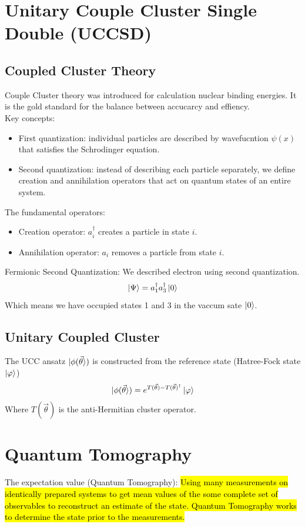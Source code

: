 \documentclass{article}
\begin{document}
\section{Unitary Couple Cluster Single Double (UCCSD)}
\subsection{Coupled Cluster Theory}
Couple Cluster theory was introduced for calculation nuclear binding energies. It is the gold standard for the balance between accucarcy and effiency. \\
Key concepts:
\begin{itemize}
	\item First quantization: individual particles are described by wavefucntion \(\psi(x)\) that satisfies the Schrodinger equation.
	\item Second quantization: instead of describing each particle separately, we define creation and annihilation operators that act on quantum states of an entire system.
\end{itemize}
The fundamental operators:
\begin{itemize}
	\item Creation operator: \(a^\dagger_i\) creates a particle in state \(i\).
	\item Annihilation operator: \(a_i\) removes a particle from state \(i\).
\end{itemize}
Fermionic Second Quantization: We described electron using second quantization.
\[\ket{\Psi} = a^\dagger_1 a^\dagger_3 \ket{0}\]
Which means we have occupied states 1 and 3 in the vaccum sate \(\ket{0}\).\\

\subsection{Unitary Coupled Cluster}
The UCC ansatz \(\ket{\phi(\vec{\theta}})\) is constructed from the reference state (Hatree-Fock state \(\ket{\varphi}\))
\begin{equation}
	\ket{\phi(\vec{\theta}}) = e^{T(\vec{\theta})-T(\vec{\theta})^\dagger}\ket{\varphi}
\end{equation}
Where \(T(\vec{\theta})\) is the anti-Hermitian cluster operator.


\section{Quantum Tomography}
The expectation value (Quantum Tomography):
\hl{Using many measurements on identically prepared systems to get mean values of the some complete set of observables to reconstruct an estimate of the state. Quantum Tomography works to
	determine the state prior to the measurements.}\\
\end{document}

